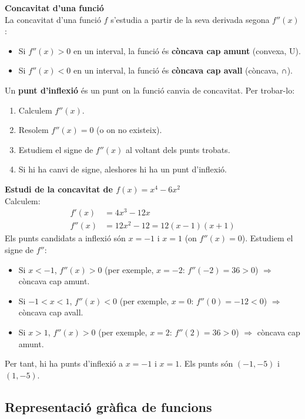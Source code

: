 \documentclass[12pt]{article}
\begin{document}
\begin{concept}
\textbf{Concavitat d'una funció}\\
La concavitat d'una funció $f$ s'estudia a partir de la seva derivada segona $f''(x)$:
\begin{itemize}
    \item Si $f''(x)>0$ en un interval, la funció és \textbf{còncava cap amunt} (convexa, U).
    \item Si $f''(x)<0$ en un interval, la funció és \textbf{còncava cap avall} (còncava, ∩).
\end{itemize}

Un \textbf{punt d'inflexió} és un punt on la funció canvia de concavitat. Per trobar-lo:
\begin{enumerate}
    \item Calculem $f''(x)$.
    \item Resolem $f''(x)=0$ (o on no existeix).
    \item Estudiem el signe de $f''(x)$ al voltant dels punts trobats.
    \item Si hi ha canvi de signe, aleshores hi ha un punt d'inflexió.
\end{enumerate}
\end{concept}

\begin{exemple}
\textbf{Estudi de la concavitat de $f(x)=x^4-6x^2$}\\
Calculem:
\begin{align*}
    f'(x) &= 4x^3-12x \\
    f''(x) &= 12x^2-12 = 12(x-1)(x+1)
\end{align*}
Els punts candidats a inflexió són $x=-1$ i $x=1$ (on $f''(x)=0$).
Estudiem el signe de $f''$:
\begin{itemize}
    \item Si $x<-1$, $f''(x)>0$ (per exemple, $x=-2$: $f''(-2)=36>0$) $\Rightarrow$ còncava cap amunt.
    \item Si $-1<x<1$, $f''(x)<0$ (per exemple, $x=0$: $f''(0)=-12<0$) $\Rightarrow$ còncava cap avall.
    \item Si $x>1$, $f''(x)>0$ (per exemple, $x=2$: $f''(2)=36>0$) $\Rightarrow$ còncava cap amunt.
\end{itemize}
Per tant, hi ha punts d'inflexió a $x=-1$ i $x=1$. Els punts són $(-1,-5)$ i $(1,-5)$.
\end{exemple}

\subsection{Representació gràfica de funcions}
\end{document}
